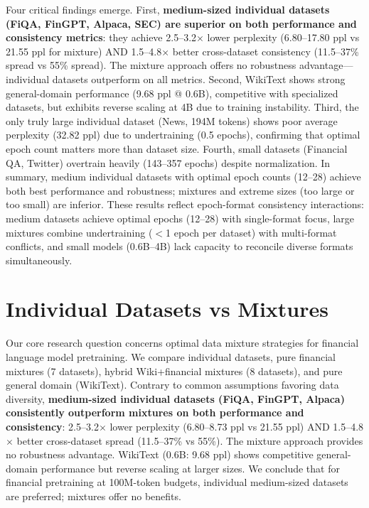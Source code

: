 Four critical findings emerge. First, \textbf{medium-sized individual datasets (FiQA, FinGPT, Alpaca, SEC) are superior on both performance and consistency metrics}: they achieve 2.5–3.2$\times$ lower perplexity (6.80–17.80 ppl vs 21.55 ppl for mixture) AND 1.5–4.8$\times$ better cross-dataset consistency (11.5–37\% spread vs 55\% spread). The mixture approach offers no robustness advantage—individual datasets outperform on all metrics. Second, WikiText shows strong general-domain performance (9.68 ppl @ 0.6B), competitive with specialized datasets, but exhibits reverse scaling at 4B due to training instability. Third, the only truly large individual dataset (News, 194M tokens) shows poor average perplexity (32.82 ppl) due to undertraining (0.5 epochs), confirming that optimal epoch count matters more than dataset size. Fourth, small datasets (Financial QA, Twitter) overtrain heavily (143–357 epochs) despite normalization. In summary, medium individual datasets with optimal epoch counts (12–28) achieve both best performance and robustness; mixtures and extreme sizes (too large or too small) are inferior. These results reflect epoch-format consistency interactions: medium datasets achieve optimal epochs (12–28) with single-format focus, large mixtures combine undertraining ($<$1 epoch per dataset) with multi-format conflicts, and small models (0.6B–4B) lack capacity to reconcile diverse formats simultaneously.

\section{Individual Datasets vs Mixtures}

Our core research question concerns optimal data mixture strategies for financial language model pretraining. We compare individual datasets, pure financial mixtures (7 datasets), hybrid Wiki+financial mixtures (8 datasets), and pure general domain (WikiText). Contrary to common assumptions favoring data diversity, \textbf{medium-sized individual datasets (FiQA, FinGPT, Alpaca) consistently outperform mixtures on both performance and consistency}: 2.5–3.2$\times$ lower perplexity (6.80–8.73 ppl vs 21.55 ppl) AND 1.5–4.8$\times$ better cross-dataset spread (11.5–37\% vs 55\%). The mixture approach provides no robustness advantage. WikiText (0.6B: 9.68 ppl) shows competitive general-domain performance but reverse scaling at larger sizes. We conclude that for financial pretraining at 100M-token budgets, individual medium-sized datasets are preferred; mixtures offer no benefits.

